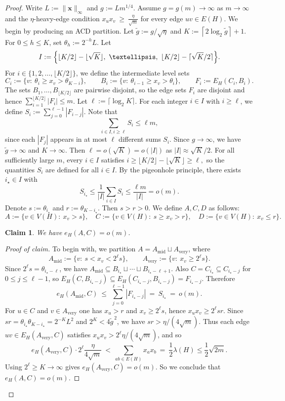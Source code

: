 \documentclass[10pt,a4paper]{amsart}
\newtheorem{claim}{Claim}
\newenvironment{poc}{\begin{proof}[Proof of claim]\renewcommand*{\qedsymbol}{$\blacksquare$}}{\end{proof}}
\begin{document}
\begin{proof}  
Write $L:=\|\bm{x}\|_\infty$ and $g:=Lm^{1/4}$.
Assume $g=g(m)\to\infty$ as $m\to\infty$ and the $\eta$-heavy-edge condition
$ x_u x_v\ \ge\ \frac{\eta}{\sqrt m}$ for every edge $uv\in E(H)$.  
We begin by producing an ACD partition. 
Let $\widetilde g:=g/\sqrt\eta$ and $ K:=\left\lceil 2\log_2 \widetilde g\right\rceil+1$. 
For \(0\le h\le K\), set \(\theta_h:=2^{-h}L\).
Let
\[
  I:=\Bigl\{\lfloor K/2\rfloor-\lfloor\sqrt K\rfloor,\ \dots,\ \lfloor K/2\rfloor-\lceil\sqrt K/2\rceil\Bigr\}.
\]
For $i\in\{1,2,\dots,\lfloor K/2\rfloor\}$, we define the intermediate level sets
\[
  C_i:=\{v:\ \theta_i\ge x_v>\theta_{K-i}\},
  \qquad
  B_i:=\{v:\ \theta_{i-1}\ge x_v>\theta_i\},
  \qquad
  F_i:=E_H(C_i,B_i).
\]
The sets $B_1,\dots,B_{\lfloor K/2\rfloor}$ are pairwise disjoint, so the edge sets $F_i$ are disjoint and hence
$\sum_{i=1}^{\lfloor K/2\rfloor}|F_i|\le m$. 
Let $\ell:=\lceil \log_2 K\rceil$.
For each integer $i\in I$ with $i\ge \ell$, we define $S_i:=\sum_{j=0}^{\ell-1}|F_{i-j}|$.
Note that 
\[
 \sum_{{i\in I, i\ge \ell}} S_i \le \ell m,
\]
since each $|F_j|$ appears in at most $\ell$ different sums $S_i$. 
Since $g\to\infty$, we have $\widetilde{g} \to \infty$ and $K\to\infty$. Then $\ell=o(\sqrt K)=o(|I|)$ as $|I| \approx \sqrt{K}/2$. 
For all sufficiently large \(m\), every \(i\in I\) satisfies
$i\ge \lfloor K/2\rfloor-\lfloor\sqrt K\rfloor \ge \ell,$
so the quantities \(S_i\) are defined for all \(i\in I\).
By the pigeonhole principle, 
there exists $i_\star\in I$ with
\[
 S_{i_\star} \le \frac{1}{|I|} \sum_{i\in I} S_i \le \frac{\ell m}{|I|}= o(m).
\]
Denote $s:=\theta_{i_\star}$ and $r:=\theta_{K-i_\star}$. Then $s>r >0$. We define $A,C,D$ as follows:
\[
  A:=\{v \in V(H):\ x_v>s\},\quad
  C:=\{v\in V(H):\ s\ge x_v>r\},\quad
  D:=\{v\in V(H):\ x_v\le r\}.
\] 

\begin{claim}
We have \(e_H(A,C)=o(m)\).
\end{claim}

\begin{poc}
To begin with, we partition $A=A_{\mathrm{mid}}\sqcup A_{\mathrm{very}}$, where 
\[
  A_{\mathrm{mid}}:=\{v:\ s<x_v<2^\ell s\},
  \qquad
  A_{\mathrm{very}}:=\{v:\ x_v\ge 2^\ell s\}. 
\]
Since $2^\ell s=\theta_{i_\star-\ell}$, we have
$A_{\mathrm{mid}}\subseteq B_{i_\star}\sqcup\cdots\sqcup B_{i_\star-\ell+1}$.
Also $C=C_{i_\star}\subseteq C_{i_\star-j}$ for $0\le j\le \ell-1$, so
$E_H(C,B_{i_\star-j})\subseteq E_H(C_{i_\star-j},B_{i_\star-j})=F_{i_\star-j}$.
Therefore
\[
  e_H(A_{\mathrm{mid}},C)\ \le\ \sum_{j=0}^{\ell-1}|F_{i_\star-j}|\ =\ S_{i_\star}\ =\ o(m).
\] 
For $u\in C$ and $v\in A_{\mathrm{very}}$ one has $x_u>r$ and $x_v\ge 2^\ell s$, hence $x_u x_v\ge 2^\ell sr$.
Since $sr=\theta_{i_\star}\theta_{K-i_\star}=2^{-K}L^2$ and $2^K<4\widetilde g^{\,2}$, we have
$sr>\eta/(4\sqrt m)$.
Thus each edge $uv\in E_H(A_{\mathrm{very}},C)$ satisfies $x_u x_v>2^\ell\eta/(4\sqrt m)$, and so
\[
  e_H(A_{\mathrm{very}},C)\cdot 2^\ell\frac{\eta}{4\sqrt m}
  \ <\
  \sum_{ab\in E(H)}x_ax_b
  \ =\ \frac{1}{2}\lambda(H) \le \frac{1}{2}\sqrt{2m}.
\]
Using $2^\ell\ge K\to\infty$ gives
$e_H(A_{\mathrm{very}},C)=o(m)$. 
So we conclude that $e_H(A,C)=o(m)$.
\end{poc}


\end{proof}
\end{document}

